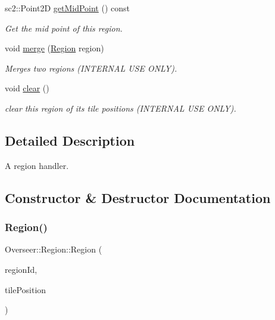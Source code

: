 \begin{DoxyCompactItemize}
sc2\+::\+Point2D \hyperlink{classOverseer_1_1Region_aabaca16412cb07744db2807121450c1e}{get\+Mid\+Point} () const
\begin{DoxyCompactList}\small\item\em Get the mid point of this region. \end{DoxyCompactList}\item 
void \hyperlink{classOverseer_1_1Region_ad532499817aecf45c88387a1a775a2fd}{merge} (\hyperlink{classOverseer_1_1Region}{Region} region)
\begin{DoxyCompactList}\small\item\em Merges two regions (I\+N\+T\+E\+R\+N\+AL U\+SE O\+N\+LY). \end{DoxyCompactList}\item 
\mbox{\label{classOverseer_1_1Region_a945c843e2061f5de20cfaf7e45fa0568}} 
void \hyperlink{classOverseer_1_1Region_a945c843e2061f5de20cfaf7e45fa0568}{clear} ()
\begin{DoxyCompactList}\small\item\em clear this region of its tile positions (I\+N\+T\+E\+R\+N\+AL U\+SE O\+N\+LY). \end{DoxyCompactList}\end{DoxyCompactItemize}


\subsection{Detailed Description}
A region handler. 

\subsection{Constructor \& Destructor Documentation}
\mbox{\label{classOverseer_1_1Region_a8de3309b915589c86745a73c157d4a9f}} 
\subsubsection{\texorpdfstring{Region()}{Region()}}
{\footnotesize\ttfamily Overseer\+::\+Region\+::\+Region (\begin{DoxyParamCaption}\item[{size\+\_\+t}]{region\+Id,  }\item[{std\+::shared\+\_\+ptr$<$ Tile\+Position $>$}]{tile\+Position }\end{DoxyParamCaption})}



